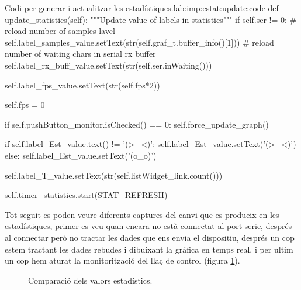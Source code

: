 \begin{code_python}{Codi per generar i actualitzar les estadístiques.}{lab:imp:estat:update:code}
def update_statistics(self):
    """Update value of labels in statistics"""
    if self.ser != 0:
        # reload number of samples lavel
        self.label_samples_value.setText(str(self.graf_t.buffer_info()[1]))
        # reload number of waiting chars in serial rx buffer
        self.label_rx_buff_value.setText(str(self.ser.inWaiting()))
        
        self.label_fps_value.setText(str(self.fps*2))
        
        self.fps = 0
        
        if self.pushButton_monitor.isChecked() == 0:
            self.force_update_graph()
            
        if self.label_Est_value.text() != '(>_<)':
            self.label_Est_value.setText('(>_<)')
        else:
            self.label_Est_value.setText('(o_o)')
        
        self.label_T_value.setText(str(self.listWidget_link.count()))
        
        self.timer_statistics.start(STAT_REFRESH)
\end{code_python}

Tot seguit es poden veure diferents captures del canvi que es produeix en les estadístiques, primer es veu quan encara no està connectat al port serie, després al connectar però no tractar les dades que ens envia el dispositiu, després un cop estem tractant les dades rebudes i dibuixant la gráfica en temps real, i per ultim un cop hem aturat la monitorització del llaç de control (figura \ref{fig:comparacio_estadistiques}).

\begin{figure}[ht!]
	\caption{Comparació dels valors estadístics.}
    \label{fig:comparacio_estadistiques}
\end{figure}

\FloatBarrier

